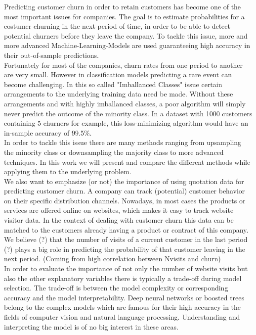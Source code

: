 \documentclass[12pt,titlepage]{article}
\begin{document}
Predicting customer churn in order to retain customers has become one of the most important issues for companies. The goal is to estimate probabilities for a costumer churning in the next period of time, in order to be able to detect
potential churners before they leave the company. To tackle this issue, more and more advanced Machine-Learning-Models are used guaranteeing high accuracy in their out-of-sample predictions. \\
Fortunately for most of the companies, churn rates from one period to another are very small. However in classification models predicting a rare event can become challenging. In this so called "Imballanced Classes" issue certain arrangements to the underlying
training data need be made. Without these arrangements and with highly imballanced classes, a poor algorithm will simply never predict the outcome of the minority class. In a dataset with 1000 customers containing 5 churners for example, this loss-minimizing
algorithm would have an in-sample accuracy of 99.5\%. \\
In order to tackle this issue there are many methods ranging from upsampling the minority class or downsampling the majority class to more advanced techniques. In this work we will
present and compare the different methods while applying them to the underlying problem. \\
We also want to emphasize (or not) the importance of using quotation data for predicting customer churn. A company can track (potential) customer behavior on their specific distribution
channels. Nowadays, in most cases the products or services are offered online on websites, which makes it easy to track website visitor data.
In the context of dealing with customer churn this data can be matched to the customers already having a product or contract of this company.
We believe (?) that the number of visits of a current customer in the last period (?) plays a big role in predicting the probability of that customer leaving in the next period.
(Coming from high correlation between Nvisits and churn)\\
In order to evaluate the importance of not only the number of website visits but also the other explanatory variables there is typically a trade-off during model selection.
The trade-off is between the model complexity or corresponding accuracy and the model interpretability. Deep neural networks or boosted trees belong to the complex models which are
famous for their high accuracy in the fields of computer vision and natural language processing. Understanding and interpreting the model is of no big interest in these areas.
\end{document}
